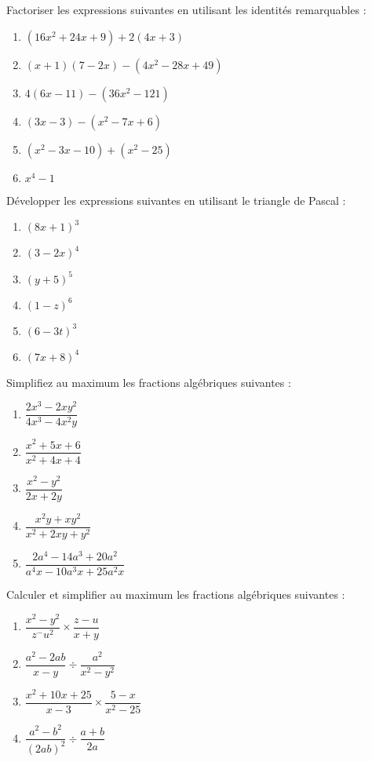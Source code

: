 \medskip
\begin{exercice}[]
Factoriser les expressions suivantes en utilisant les identités remarquables :\\
\begin{enumerate}
\item $(16x^2+24x+9)+2(4x+3)$
\item $(x+1)(7-2x)-(4x^2-28x+49)$
\item $4(6x-11)-(36x^2-121)$
\item $(3x-3)-(x^2-7x+6)$
\item $(x^2-3x-10)+(x^2-25)$
\item $x^4-1$
\end{enumerate}
\end{exercice}
\medskip
\begin{exercice}[]
Développer les expressions suivantes en utilisant le triangle de Pascal :\\
\begin{multicols}{2}
\begin{enumerate}
\item $(8x+1)^3$
\item $(3-2x)^4$
\item $(y+5)^5$
\item $(1-z)^6$
\item $(6-3t)^3$
\item $(7x+8)^4$
\end{enumerate}
\end{multicols}
\end{exercice}
\bigskip


\begin{exercice}[]
Simplifiez au maximum les fractions algébriques suivantes :\\

\begin{enumerate}
\item $\dfrac{2x^3-2xy^2}{4x^3-4x^2y}$
\item $\dfrac{x^2+5x+6}{x^2+4x+4}$
\item $\dfrac{x^2-y^2}{2x+2y}$
\item $\dfrac{x^2y+xy^2}{x^2+2xy+y^2}$
\item $\dfrac{2a^4-14a^3+20a^2}{a^4x-10a^3x+25a^2x}$
\end{enumerate}
\end{exercice}

\begin{exercice}[]
Calculer et simplifier au maximum les fractions algébriques suivantes :\\
\begin{enumerate}
\item $\dfrac{x^2-y^2}{z^-u^2} \times \dfrac{z-u}{x+y}$
\item $\dfrac{a^2-2ab}{x-y} \div \dfrac{a^2}{x^2-y^2} $
\item $\dfrac{x^2+10x+25}{x-3} \times \dfrac{5-x}{x^2-25}$
\item $\dfrac{a^2-b^2}{(2ab)^2} \div \dfrac{a+b}{2a}$
\end{enumerate}
\end{exercice}

